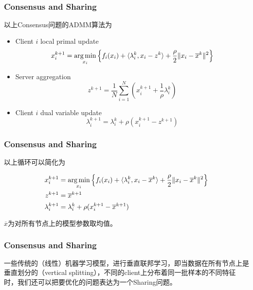 \begin{frame}
\frametitle{Consensus and Sharing}

以上Consensus问题的ADMM算法为

\vspace{0.8em}

\begin{itemize}
    \item Client $i$ local primal update
    $$x^{k+1}_i = \operatorname*{arg\,min}\limits_{x_i} \left\{ f_i(x_i) + \langle \lambda_i^k, x_i-z^k \rangle + \dfrac{\rho}{2}\lVert x_i-\overline{x}^k \rVert^2 \right\}$$
    \item Server aggregation
    $$z^{k+1} = \dfrac{1}{N}\sum\limits_{i=1}^N (x^{k+1}_i + \dfrac{1}{\rho} \lambda^{k}_i)$$
    \item Client $i$ dual variable update
    $$\lambda_i^{k+1} = \lambda_i^k + \rho(x^{k+1}_i-z^{k+1})$$
\end{itemize}
\end{frame}


\begin{frame}
\frametitle{Consensus and Sharing}

以上循环可以简化为

\vspace{0.3em}

\begin{align*}
x^{k+1}_i & = \operatorname*{arg\,min}\limits_{x_i} \left\{ f_i(x_i) + \langle \lambda_i^k, x_i-\overline{x}^k \rangle + \dfrac{\rho}{2}\lVert x_i-\overline{x}^k \rVert^2 \right\} \\
z^{k+1} & = \overline{x}^{k+1} \\
\lambda_i^{k+1} & = \lambda_i^k + \rho(x^{k+1}_i-\overline{x}^{k+1})
\end{align*}

\vspace{0.5em}

$\overline{x}$为对所有节点上的模型参数取均值。


\end{frame}


\begin{frame}
\frametitle{Consensus and Sharing}

一些传统的（线性）机器学习模型，进行垂直联邦学习，即当数据在所有节点上是垂直划分的（vertical splitting），不同的client上分布着同一批样本的不同特征时，我们还可以把要优化的问题表达为一个Sharing问题。

\end{frame}

